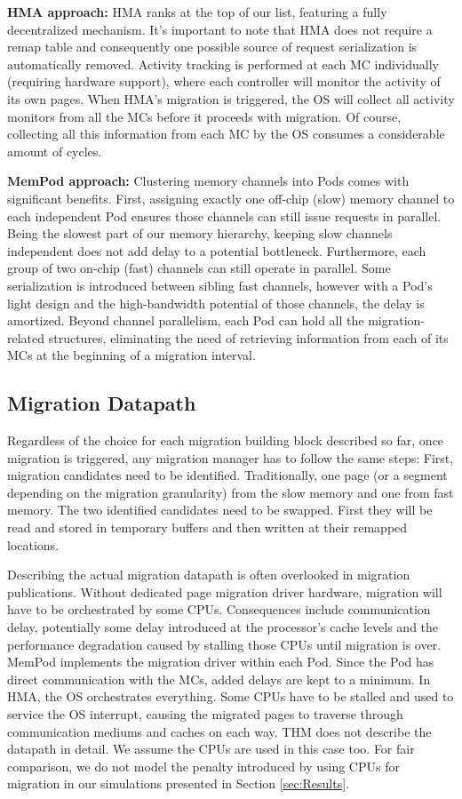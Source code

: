 	\textbf{HMA approach:} HMA ranks at the top of our list, featuring a fully decentralized mechanism. It's important to note that HMA does not require a remap table and consequently one possible source of request serialization is automatically removed. Activity tracking is performed at each MC individually (requiring hardware support), where each controller will monitor the activity of its own pages. When HMA's migration is triggered, the OS will collect all activity monitors from all the MCs before it proceeds with migration. Of course, collecting all this information from each MC by the OS consumes a considerable amount of cycles.

	\textbf{MemPod approach:} Clustering memory channels into Pods comes with significant benefits. First, assigning exactly one off-chip (slow) memory channel to each independent Pod ensures those channels can still issue requests in parallel. Being the slowest part of our memory hierarchy, keeping slow channels independent does not add delay to a potential bottleneck. Furthermore, each group of two on-chip (fast) channels can still operate in parallel. Some serialization is introduced between sibling fast channels, however with a Pod's light design and the high-bandwidth potential of those channels, the delay is amortized. Beyond channel parallelism, each Pod can hold all the migration-related structures, eliminating the need of retrieving information from each of its MCs at the beginning of a migration interval.
	

\subsection{Migration Datapath}
Regardless of the choice for each migration building block described so far, once migration is triggered, any migration manager has to follow the same steps: First, migration candidates need to be identified. Traditionally, one page (or a segment depending on the migration granularity) from the slow memory and one from fast memory. The two identified candidates need to be swapped. First they will be read and stored in temporary buffers and then written at their remapped locations. 

Describing the actual migration datapath is often overlooked in migration publications. Without dedicated page migration driver hardware, migration will have to be orchestrated by some CPUs. Consequences include communication delay, potentially some delay introduced at the processor's cache levels and the performance degradation caused by stalling those CPUs until migration is over. MemPod implements the migration driver within each Pod. Since the Pod has direct communication with the MCs, added delays are kept to a minimum. In HMA, the OS orchestrates everything. Some CPUs have to be stalled and used to service the OS interrupt, causing the migrated pages to traverse through communication mediums and caches on each way. THM does not describe the datapath in detail. We assume the CPUs are used in this case too. For fair comparison, we do not model the penalty introduced by using CPUs for migration in our simulations presented in Section \ref{sec:Results}.

